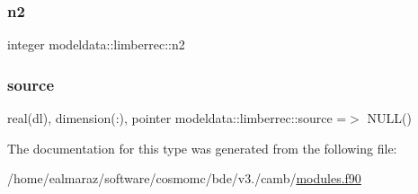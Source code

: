 \mbox{\label{structmodeldata_1_1limberrec_a1f53b69ba50a106b34b7723bced5c827}} 
\subsubsection{\texorpdfstring{n2}{n2}}
{\footnotesize\ttfamily integer modeldata\+::limberrec\+::n2}

\mbox{\label{structmodeldata_1_1limberrec_a492fc4307ac51f48699f09688787dc72}} 
\subsubsection{\texorpdfstring{source}{source}}
{\footnotesize\ttfamily real(dl), dimension(\+:), pointer modeldata\+::limberrec\+::source =$>$ N\+U\+LL()}



The documentation for this type was generated from the following file\+:\begin{DoxyCompactItemize}
\item 
/home/ealmaraz/software/cosmomc/bde/v3./camb/\mbox{\hyperlink{modules_8f90}{modules.\+f90}}\end{DoxyCompactItemize}
